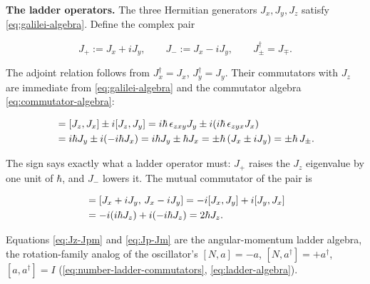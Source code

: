 \medskip\noindent\textbf{The ladder operators.} The three Hermitian generators $J_x,J_y,J_z$ satisfy \eqref{eq:galilei-algebra}. Define the complex pair
\begin{linenomath}
    \begin{equation}
        J_+ := J_x + iJ_y,\qquad
        J_- := J_x - iJ_y,
        \qquad
        J_\pm^\dagger = J_\mp.
        \label{eq:Jpm-def}
    \end{equation}
\end{linenomath}
The adjoint relation follows from $J_x^\dagger=J_x$, $J_y^\dagger=J_y$. Their commutators with $J_z$ are immediate from \eqref{eq:galilei-algebra} and the commutator algebra \eqref{eq:commutator-algebra}:
\begin{linenomath}
    \begin{align}
        [J_z,J_\pm] &= [J_z,J_x] \pm i[J_z,J_y]
        = i\hbar\,\epsilon_{zxy}J_y \pm i(i\hbar\,\epsilon_{zyx}J_x) \notag\\
        &= i\hbar J_y \pm i(-i\hbar J_x) = i\hbar J_y \pm \hbar J_x
        = \pm\hbar\,(J_x \pm iJ_y)
        = \pm\hbar\,J_\pm.
        \label{eq:Jz-Jpm}
    \end{align}
\end{linenomath}
The sign says exactly what a ladder operator must: $J_+$ raises the $J_z$ eigenvalue by one unit of $\hbar$, and $J_-$ lowers it. The mutual commutator of the pair is
\begin{linenomath}
    \begin{align}
        [J_+,J_-] &= [J_x+iJ_y,\,J_x-iJ_y]
        = -i[J_x,J_y] + i[J_y,J_x] \notag\\
        &= -i(i\hbar J_z) + i(-i\hbar J_z)
        = 2\hbar J_z.
        \label{eq:Jp-Jm}
    \end{align}
\end{linenomath}
Equations \eqref{eq:Jz-Jpm} and \eqref{eq:Jp-Jm} are the angular-momentum ladder algebra, the rotation-family analog of the oscillator's $[N,a]=-a$, $[N,a^\dagger]=+a^\dagger$, $[a,a^\dagger]=I$ (\eqref{eq:number-ladder-commutators}, \eqref{eq:ladder-algebra}).

